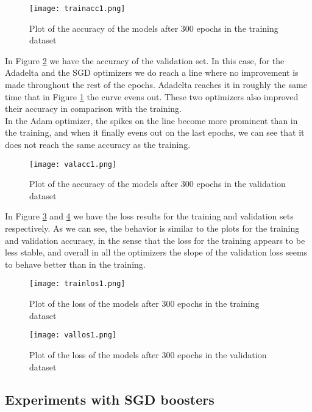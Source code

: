 \documentclass[review]{elsarticle}
\begin{document}
 
\begin{figure}[]
  \centering
  \texttt{[image: trainacc1.png]}  
	\caption{Plot of the accuracy of the models after 300 epochs in the training dataset}
\label{fig3}
\end{figure}

In Figure \ref{fig4} we have the accuracy of the validation set. In this case, for the Adadelta and the SGD optimizers we do reach a line where no improvement is made throughout the rest of the epochs. Adadelta reaches it in roughly the same time that in Figure \ref{fig3} the curve evens out. These two optimizers also improved their accuracy in comparison with the training.\\

In the Adam optimizer, the spikes on the line become more prominent than in the training, and when it finally evens out on the last epochs, we can see that it does not reach the same accuracy as the training.\\

\begin{figure}[]
  \centering
  \texttt{[image: valacc1.png]}  
	\caption{Plot of the accuracy of the models after 300 epochs in the validation dataset}
\label{fig4}
\end{figure}

In Figure \ref{fig5} and \ref{fig6} we have the loss results for the training and validation sets respectively. As we can see, the behavior is similar to the plots for the training and validation accuracy, in the sense that the loss for the training appears to be less stable, and overall in all the optimizers the slope of the validation loss seems to behave better than in the training.\\

\begin{figure}[]
  \centering
  \texttt{[image: trainlos1.png]}  
	\caption{Plot of the loss of the models after 300 epochs in the training dataset}
\label{fig5}
\end{figure}

\begin{figure}[]
  \centering
  \texttt{[image: vallos1.png]}  
	\caption{Plot of the loss of the models after 300 epochs in the validation dataset}
\label{fig6}
\end{figure}

\subsection{Experiments with SGD boosters}
\end{document}
